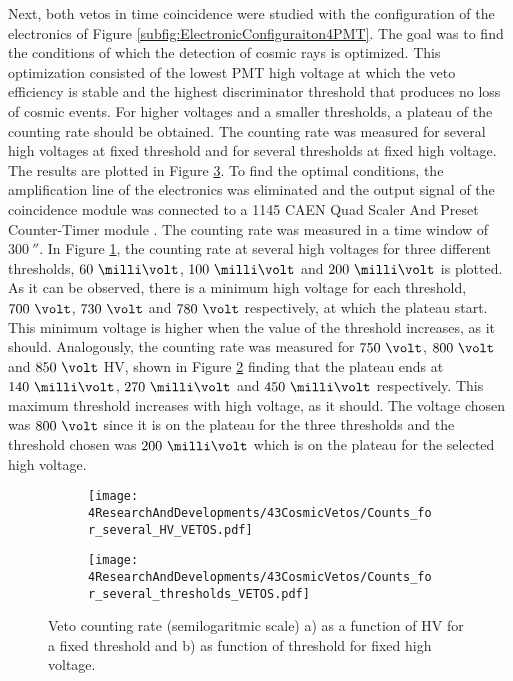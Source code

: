 Next, both vetos in time coincidence were studied with the configuration of the electronics of Figure \ref{subfig:ElectronicConfiguraiton4PMT}. The goal was to find the conditions of which the detection of cosmic rays is optimized. This optimization consisted of the lowest PMT high voltage at which the veto efficiency is stable and the highest discriminator threshold that produces no loss of cosmic events. For higher voltages and a smaller thresholds, a plateau of the counting rate should be obtained. The counting rate was measured for several high voltages at fixed threshold and for several thresholds at fixed high voltage. The results are plotted in Figure \ref{fig:HVandThresholdsPLateaus}. To find the optimal conditions, the amplification line of the electronics was eliminated and the output signal of the coincidence module was connected to a 1145 CAEN Quad Scaler And Preset Counter-Timer module \cite{ScalerDataSheet}. The counting rate was measured in a time window of $300~\second$. In Figure \ref{subfig:HVPLateauVetos}, the counting rate at several high voltages for three different thresholds, $60~\milli\volt$, $100~\milli\volt$ and $200~\milli\volt$ is plotted. As it can be observed, there is a minimum high voltage for each threshold, $700~\volt$, $730~\volt$ and $780~\volt$ respectively, at which the plateau start. This minimum voltage is higher when the value of the threshold increases, as it should. Analogously, the counting rate was measured for $750~\volt$, $800~\volt$ and $850~\volt$ HV, shown in Figure \ref{subfig:ThresholdsPlateau} finding that the plateau ends at $140~\milli\volt$, $270~\milli\volt$ and $450~\milli\volt$ respectively. This maximum threshold increases with high voltage, as it should. The voltage chosen was $800~\volt$ since it is on the plateau for the three thresholds and the threshold chosen was $200~\milli\volt$ which is on the plateau for the selected high voltage. 
\begin{figure}
\centering
    \begin{subfigure}[b]{0.8\textwidth}
    \centering
    \texttt{[image: 4ResearchAndDevelopments/43CosmicVetos/Counts\_for\_several\_HV\_VETOS.pdf]}  
    \caption{\label{subfig:HVPLateauVetos}}
    \end{subfigure}
    \hfill
    \begin{subfigure}[b]{0.8\textwidth}
    \centering
    \texttt{[image: 4ResearchAndDevelopments/43CosmicVetos/Counts\_for\_several\_thresholds\_VETOS.pdf]}  
    \caption{\label{subfig:ThresholdsPlateau}}
    \end{subfigure}
 \caption{ Veto counting rate (semilogaritmic scale) a) as a function of HV for a fixed threshold and b) as function of threshold for fixed high voltage.}
 \label{fig:HVandThresholdsPLateaus}
\end{figure}
